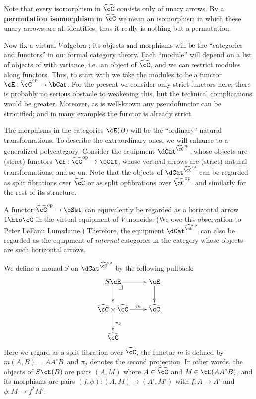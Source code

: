 \documentclass{amsart}
\newcommand{\C}{\cC}
\renewcommand{\Chat}{\ensuremath{\widehat{\C}}\xspace}
\newcommand{\E}{\cE}
\renewcommand{\o}{^{\circ}}
\begin{document}
Note that every isomorphism in \Chat consists only of unary arrows.
By a \textbf{permutation isomorphism} in \Chat we mean an isomorphism in which these unary arrows are all identities; thus it really is nothing but a permutation.

Now fix a virtual $V$-algebra \C; its objects and morphisms will be the ``categories and functors'' in our formal category theory.
Each ``module'' will depend on a list of objects of \C with variance, i.e.\ an object of \Chat, and we can restrict modules along functors.
Thus, to start with we take the modules to be a functor $\E:\Chat\op\to \bCat$.
For the present we consider only strict functors here; there is probably no serious obstacle to weakening this, but the technical complications would be greater.
Moreover, as is well-known any pseudofunctor can be strictified; and in many examples the functor is already strict.

The morphisms in the categories $\E(B)$ will be the ``ordinary'' natural transformations.
To describe the extraordinary ones, we will enhance \E to a generalized polycategory.
Consider the equipment $\dCat^{\Chat\op}$, whose objects are (strict) functors $\E:\Chat\op\to\bCat$, whose vertical arrows are (strict) natural transformations, and so on.
Note that the objects of $\dCat^{\Chat\op}$ can be regarded as split fibrations over $\Chat$ or as split opfibrations over $\Chat\op$, and similarly for the rest of its structure.

\begin{rmk}
  A functor $\Chat\op\to\bSet$ can equivalently be regarded as a horizontal arrow $1\hto \C$ in the virtual equipment of $V$-monoids.
  (We owe this observation to Peter LeFanu Lumsdaine.)
  Therefore, the equipment $\dCat^{\Chat\op}$ can also be regarded as the equipment of \emph{internal} categories in the category whose objects are such horizontal arrows.
\end{rmk}

We define a monad $S$ on $\dCat^{\Chat\op}$ by the following pullback:
\[ \xymatrix{ S \E \ar[r] \ar[d] \pullback & \E \ar[d] \\
  \Chat\times\Chat \ar[r]^-m \ar[d]^{\pi_2} & \Chat \\
  \Chat }\]
Here we regard \E as a split fibration over \Chat, the functor $m$ is defined by $m(A,B) = A A\o B$, and $\pi_2$ denotes the second projection.
In other words, the objects of $S\E(B)$ are pairs $(A,M)$ where $A\in\Chat$ and $M\in\E(A A\o B)$, and its morphisms are pairs $(f,\phi) : (A,M)\to (A',M')$ with $f:A\to A'$ and $\phi : M \to f^*M'$.
\end{document}
